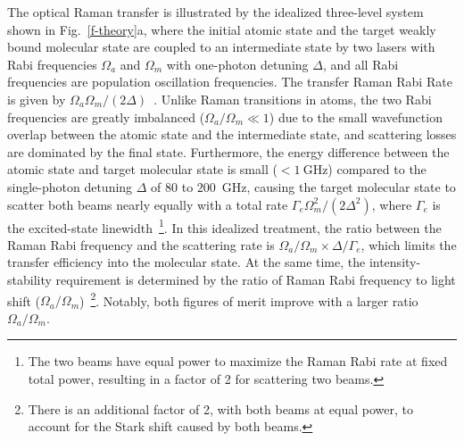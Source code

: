 \documentclass[aps,prl,twocolumn,10pt,superscriptaddress]{revtex4-1}
\begin{document}
The optical Raman transfer is illustrated
by the idealized three-level system shown in Fig.~\ref{f-theory}a,
where the initial atomic state and the target weakly bound molecular state are coupled to an intermediate state by two lasers with Rabi frequencies $\Omega_a$ and $\Omega_m$ with one-photon detuning $ \Delta $, and all Rabi frequencies are population oscillation frequencies.  %
The transfer Raman Rabi Rate is given by $\Omega_a\Omega_m / (2\Delta)$~\cite{Wineland2003}.
Unlike Raman transitions in atoms, the two Rabi frequencies are greatly imbalanced ($\Omega_a/\Omega_m \ll 1$) %
due to the small wavefunction overlap between the atomic state and the intermediate state, %
and scattering losses are dominated by the final state. Furthermore, the energy difference between the atomic state and target molecular state is small ($ < 1~\mathrm{GHz} $) compared to the single-photon detuning $ \Delta $ of $80$ to $200$~GHz, causing the target molecular state to scatter both beams nearly equally with a total rate $ \Gamma_e \Omega_m^2 / (2\Delta^2)$, where $ \Gamma_e $ is the excited-state linewidth~\footnote{The two beams have equal power to maximize the Raman Rabi rate at fixed total power, resulting in a factor of 2 for scattering two beams.}.
In this idealized treatment, the ratio between the Raman Rabi frequency and the scattering rate is $ \Omega_a/\Omega_m \times \Delta/\Gamma_e $, which limits the transfer efficiency into the molecular state. At the same time, the intensity-stability requirement is determined by the ratio of Raman Rabi frequency to light shift ($\Omega_a/\Omega_m$)~\footnote{There is an additional factor of 2, with both beams at equal power,
  to account for the Stark shift caused by both beams.}. Notably, both figures of merit improve with a larger ratio $\Omega_a/\Omega_m$. %
\end{document}
